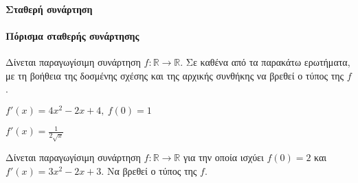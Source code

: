 \documentclass[11pt,a4paper,modern]{FFExercises}
\begin{document}
\paragraph{Σταθερή συνάρτηση}
\askhsh
\paragraph{Πόρισμα σταθερής συνάρτησης}
\askhsh Δίνεται παραγωγίσιμη συνάρτηση $f:\mathbb{R}\to\mathbb{R}$. Σε καθένα από τα παρακάτω ερωτήματα, με τη βοήθεια της δοσμένης σχέσης και της αρχικής συνθήκης να βρεθεί ο τύπος της $f$.
\begin{alist}
\item $f'(x)=4x^2-2x+4,\ f(0)=1$
\item $f'(x)=\frac{1}{2\sqrt{x}}$
\item 
\end{alist}
\askhsh Δίνεται παραγωγίσιμη συνάρτηση $f:\mathbb{R}\to\mathbb{R}$ για την οποία ισχύει $f(0)=2$ και $f'(x)=3x^2-2x+3$. Να βρεθεί ο τύπος της $f$.
\end{document}
